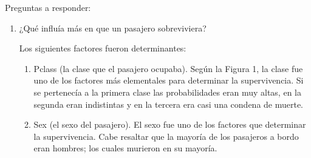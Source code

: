 





Preguntas a responder: 

\begin{enumerate}
	\item¿Qué influía más en que un pasajero sobreviviera?
	\begin{sol}
		Los siguientes factores fueron determinantes:
		\begin{enumerate}
			\item Pclass (la clase que el pasajero ocupaba). 
		Según la Figura 1, la clase fue uno de los factores más elementales para determinar la supervivencia. Si se pertenecía a la primera clase las probabilidades eran muy altas, en la segunda eran indistintas y en la tercera era casi una condena de muerte. 
		
			\item Sex (el sexo del pasajero).  El sexo fue uno de los factores que determinar la supervivencia. Cabe resaltar que la mayoría de los pasajeros a bordo eran hombres; los cuales murieron en su mayoría. 
			

\end{enumerate}
\end{sol}
\end{enumerate}
